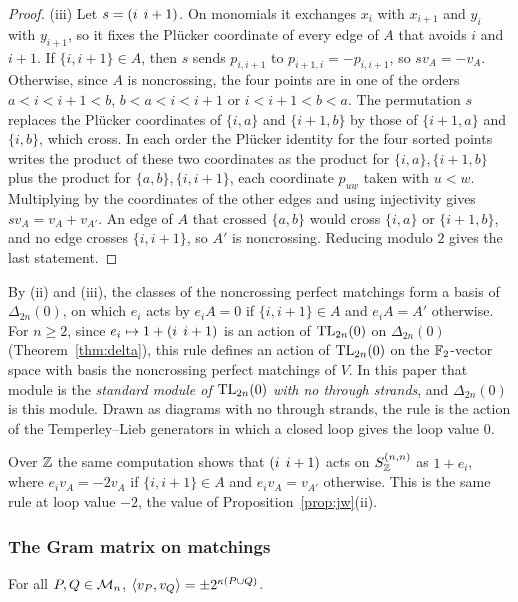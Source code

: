 \begin{proof}
(iii) Let $s=(i\;\,i+1)$. On monomials it exchanges $x_i$ with $x_{i+1}$ and $y_i$ with $y_{i+1}$, so it fixes the Pl\"ucker coordinate of every edge of $A$ that avoids $i$ and $i+1$. If $\{i,i+1\}\in A$, then $s$ sends $p_{i,i+1}$ to $p_{i+1,i}=-p_{i,i+1}$, so $sv_A=-v_A$. Otherwise, since $A$ is noncrossing, the four points are in one of the orders $a<i<i+1<b$, $b<a<i<i+1$ or $i<i+1<b<a$. The permutation $s$ replaces the Pl\"ucker coordinates of $\{i,a\}$ and $\{i+1,b\}$ by those of $\{i+1,a\}$ and $\{i,b\}$, which cross. In each order the Pl\"ucker identity for the four sorted points writes the product of these two coordinates as the product for $\{i,a\},\{i+1,b\}$ plus the product for $\{a,b\},\{i,i+1\}$, each coordinate $p_{uw}$ taken with $u<w$. Multiplying by the coordinates of the other edges and using injectivity gives $sv_A=v_A+v_{A'}$. An edge of $A$ that crossed $\{a,b\}$ would cross $\{i,a\}$ or $\{i+1,b\}$, and no edge crosses $\{i,i+1\}$, so $A'$ is noncrossing. Reducing modulo $2$ gives the last statement.
\end{proof}

By (ii) and (iii), the classes of the noncrossing perfect matchings form a basis of $\Delta_{2n}(0)$, on which $e_i$ acts by $e_{i}A=0$ if $\{i,i+1\}\in A$ and $e_{i}A=A'$ otherwise. For $n\ge2$, since $e_i\mapsto1+(i\;\,i+1)$ is an action of $\mathrm{TL}_{2n}(0)$ on $\Delta_{2n}(0)$ (Theorem~\ref{thm:delta}), this rule defines an action of $\mathrm{TL}_{2n}(0)$ on the $\mathbb{F}_2$-vector space with basis the noncrossing perfect matchings of $V$. In this paper that module is the \emph{standard module of $\mathrm{TL}_{2n}(0)$ with no through strands}, and $\Delta_{2n}(0)$ is this module. Drawn as diagrams with no through strands, the rule is the action of the Temperley--Lieb generators in which a closed loop gives the loop value $0$. %

Over $\mathbb{Z}$ the same computation shows that $(i\;\,i+1)$ acts on $S^{(n,n)}_{\mathbb{Z}}$ as $1+e_i$, where $e_{i}v_A=-2v_A$ if $\{i,i+1\}\in A$ and $e_{i}v_A=v_{A'}$ otherwise. This is the same rule at loop value $-2$, the value of Proposition~\ref{prop:jw}(ii).

\subsubsection{The Gram matrix on matchings}

\begin{lemma}\label{lem:gram}
For all $P,Q\in\mathcal{M}_n$, $\langle v_P,v_Q\rangle=\pm2^{\kappa(P\cup Q)}$.
\end{lemma}

